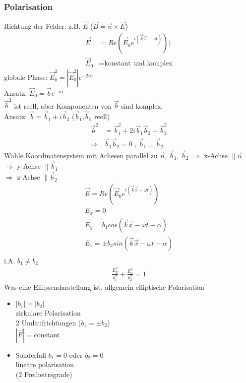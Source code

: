 \documentclass[a4paper]{article}
\begin{document}
\subsubsection{Polarisation}
Richtung der Felder: z.B. $\vec{E}$ ($\vec{B}=\vec{n}\times\vec{E}$)
\begin{align}
\vec{E}&=Re(\vec{E}_0 e^{i(\vec{k}\vec{x}-\omega t)}))\\
\vec{E}_0&=\text{konstant und komplex}
\end{align}
globale Phase: $\vec{E}_0^2=|\vec{E}_0^2|e^{-2i\alpha}$\\
Ansatz: $\vec{E}_0=\vec{b}e^{-i\alpha}$\\
$\vec{b}^2$ ist reell, aber Komponenten von $\vec{b}$ sind komplex.\\
Ansatz: $\vec{b}=\vec{b}_1+i\vec{b}_2$ ($\vec{b}_1$,$\vec{b}_2$ reell)\\
\begin{align}
\vec{b}^2&=\vec{b}_1^2+2i\vec{b}_1\vec{b}_2-\vec{b}_2^2\\
\Rightarrow &\vec{b}_1\vec{b}_2=0 \text{ , }\vec{b}_1\perp\vec{b}_2
\end{align}
Wähle Koordinatensystem mit Achesen parallel zu $\vec{n}$, $\vec{b}_1$,
$\vec{b}_2$
$\Rightarrow$ x-Achse $\parallel \vec{n}$\\
$\Rightarrow$ y-Achse $\parallel \vec{b}_1$\\
$\Rightarrow$ z-Achse $\parallel \vec{b}_2$\\
\begin{align}
\vec{E}=Re(\vec{E}_0 e^{i(\vec{k}\vec{x}-\omega t)})\\
E_x=0\\
E_y=b_1 cos(\vec{k}\vec{x}-\omega t -\alpha)\\
E_z=\pm b_2 sin(\vec{k}\vec{x}-\omega t -\alpha)\\
\end{align}
i.A. $b_1\neq b_2$
\begin{align}
\frac{E_y^2}{b_1^2}+\frac{E_z^2}{b_2^2}=1
\end{align}
Was eine Ellipsendarstellung ist.
allgemein elliptische Polarisation
\begin{itemize}
  \item $|b_1|=|b_2|$\\ zirkulare Polarisation \\ 2 Umlaufrichtungen ($b_1=\pm
  b_2$) \\ $|\vec{E}|=$constant
  \item Sonderfall $b_1=0$ oder $b_2=0$ \\ lineare polarisation \\ (2
  Freiheitrsgrade)
\end{itemize}
\end{document}

